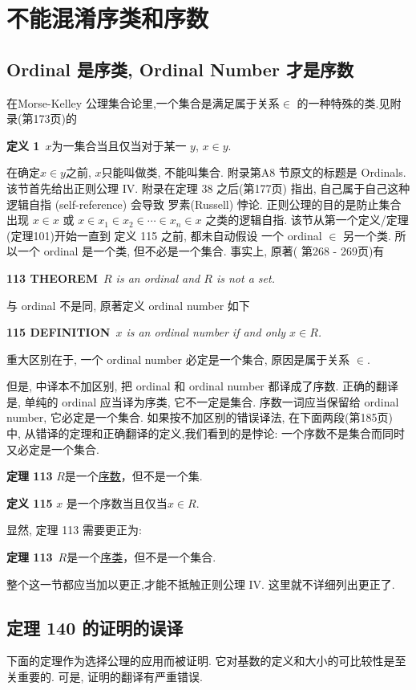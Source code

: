 \documentclass[zihao=-4,a4paper]{ctexart}
\begin{document}
\section{不能混淆序类和序数}
\subsection{Ordinal 是序类, Ordinal Number 才是序数}
在Morse-Kelley 公理集合论里,一个集合是满足属于关系$\in$ 的一种特殊的类.见附录(\cite{jkelley2010zh}第173页)的

{\bf 定义 1}\, {\kaishu $x$为一集合当且仅当对于某一 $y$, $x\in y$. }

在确定$x\in y$之前, $x$只能叫做类, 不能叫集合.
附录第A8 节原文的标题是 Ordinals. 该节首先给出正则公理 IV. 附录在定理 38 之后(\cite{jkelley2010zh}第177页) 指出, 自己属于自己这种逻辑自指 (self-reference) 会导致 
罗素(Russell) 悖论. 正则公理的目的是防止集合出现 $x\in x$ 或 
$x\in x_1 \in x_2 \in \cdots \in x_n \in x$
之类的逻辑自指. 该节从第一个定义/定理 (定理101)开始一直到 定义 115 之前, 都未自动假设 一个 ordinal $\in$ 另一个类. 所以一个 ordinal 是一个类, 但不必是一个集合.
事实上, 原著(\cite{jkelley1975} 第268 - 269页)有

{\bf 113 THEOREM}\,
{\sl 
	$R$ is an ordinal and $R$ is not a set.
}

\noindent 与 ordinal 不是同, 原著定义 ordinal number 如下

{\bf 115 DEFINITION}\,
{\sl 
	$x$ is an ordinal number if and only $x \in R$.
}

\noindent 重大区别在于, 一个 ordinal number 必定是一个集合, 原因是属于关系 $\in$.

但是, 中译本不加区别, 把 ordinal  和 ordinal number 都译成了序数. 正确的翻译是, 单纯的 ordinal 应当译为{\kaishu 序类}, 它不一定是集合. {\kaishu 序数}一词应当保留给 ordinal number, 它必定是一个集合. 
如果按不加区别的错误译法, 在下面两段(\cite{jkelley2010zh}第185页) 中, 从错译的定理和正确翻译的定义,我们看到的是悖论: 一个序数不是集合而同时又必定是一个集合.

{\bf 定理 113}
{\kaishu
$R$是一个\underline{序数}，但不是一个集.
}

{\bf 定义 115}
{\kaishu
$x$ 是一个序数当且仅当$x\in R$.
}

\noindent 显然, 定理 113 需要更正为:

{\bf 定理 113}\, 
{\kaishu
	$R$是一个\underline{序类}，但不是一个集合.
}

整个这一节都应当加以更正,才能不抵触正则公理 IV. 这里就不详细列出更正了.

\subsection{定理 140 的证明的误译}
下面的定理作为选择公理的应用而被证明. 它对基数的定义和大小的可比较性是至关重要的. 可是, 证明的翻译有严重错误.
\end{document}
